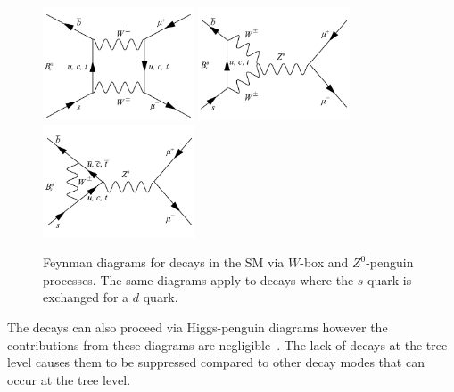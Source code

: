 \begin{figure}[bt]
    \centering
        \includegraphics[width=0.4\textwidth]{./Figs/Theory/W_diagram.pdf}
        \includegraphics[width=0.4\textwidth]{./Figs/Theory/Z0_penguin_v1.pdf}
        \includegraphics[width=0.4\textwidth]{./Figs/Theory/Z0_penguin_v2.pdf}
    \caption{Feynman diagrams for \bsmumu decays in the SM via $W$-box and $Z^0$-penguin processes. The same diagrams apply to \bdmumu decays where the $s$ quark is exchanged for a $d$ quark.}
    \label{fig:SM_diag}
\end{figure}

The decays can also proceed via Higgs-penguin diagrams however the contributions from these diagrams are negligible~\cite{Arbey:2012ax}. %
The lack of \bmumu decays at the tree level causes them to be suppressed compared to other \bsd decay modes that can occur at the tree level.



